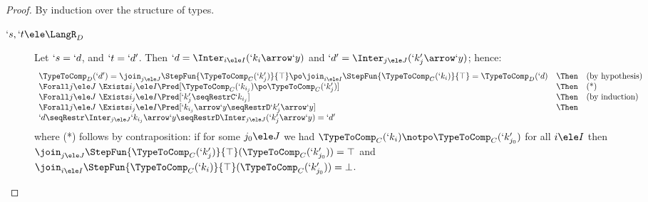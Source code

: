 \documentclass{lmcs}
\begin{document}
 \begin{proof}
By induction over the structure of types. 
 \begin{description}

 \item [$ `s,`t \ele \LangR_D $] 
Let $ `s = `d$, and $`t=`d'$.
Then $`d = \Inter_{i \ele I}(`k_i\arrow `y)$ and $`d' = \Inter_{j \ele J}(`k'_j\arrow `y)$; hence:	
%
%
 \[ \begin{array}{lll}
\TypeToComp_D(`d') = \join_{j \ele J} \StepFun{\TypeToComp_C(`k'_j) }{ \top} \po \join_{i \ele I} \StepFun{\TypeToComp_C(`k_i) }{ \top} = \TypeToComp_D(`d) & \Then & (\textrm{by hypothesis}) \\ %
\Forall j \ele J\ \Exists i_j \ele I \Pred[ \TypeToComp_C(`k_{i_j}) \po \TypeToComp_C(`k'_j) ] & \Then & (\textrm{*}) \\ %
\Forall j \ele J\ \Exists i_j \ele I \Pred[ `k'_j \seqRestrC `k_{i_j} ] & \Then & (\textrm{by induction}) \\ %
\Forall j \ele J\ \Exists i_j \ele I \Pred[ `k_{i_j}\arrow `y \seqRestrD `k'_j\arrow `y ] & \Then & \\
`d \seqRestr \Inter_{j \ele J} `k_{i_j}\arrow `y \seqRestrD \Inter_{j \ele J}(`k'_j\arrow `y) = `d'
 \end{array} \]
where (*) follows by contraposition: if for some $j_0 \ele J$ we had 
$\TypeToComp_C(`k_i) \notpo \TypeToComp_C(`k'_{j_0})$ for all $i \ele I$ then 
$\join_{j \ele J} \StepFun{\TypeToComp_C(`k'_j) }{ \top}(\TypeToComp_C(`k'_{j_0})) = \top$ and 
$\join_{i \ele I} \StepFun{\TypeToComp_C(`k_i) }{ \top} (\TypeToComp_C(`k'_{j_0})) = \bot$.


\end{description}
\end{proof}
\end{document}
